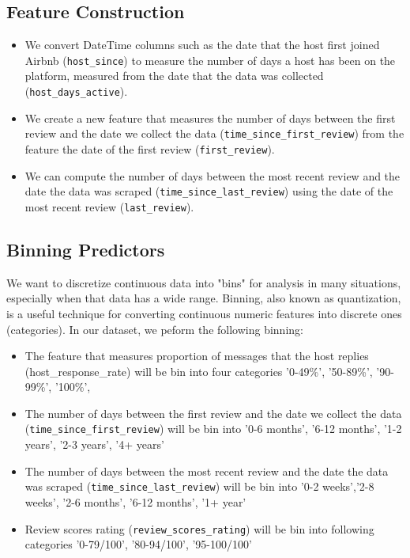 \subsection{Feature Construction}

\begin{itemize}

    \item We convert DateTime columns such as the date that the host first joined Airbnb
        (\texttt{host\_since}) to measure the number of days a host has been on
        the platform, measured from the date that the data was collected
        (\texttt{host\_days\_active}).

    \item We create a new feature that measures the number of days between the first
        review and  the date we collect the data
        (\texttt{time\_since\_first\_review}) from
        the feature the date of the first review (\texttt{first\_review}).

    \item We can compute the number of days between the most recent review and
        the date the data was scraped (\texttt{time\_since\_last\_review}) using the date of the
        most recent review (\texttt{last\_review}).
\end{itemize}

\subsection{Binning Predictors}

We want to discretize continuous data into "bins" for analysis in many situations, especially when that data has a wide range.
Binning, also known as quantization, is a useful technique for converting continuous numeric features into discrete ones (categories).
In our dataset, we peform the following binning:
\begin{itemize}

    \item The feature that measures proportion of messages that the host replies
(host\_response\_rate) will be bin into four categories '0-49\%', '50-89\%',
'90-99\%', '100\%',

    \item The number of days between the first review and the date we collect the data
        (\texttt{time\_since\_first\_review}) will be bin into '0-6 months', '6-12 months', '1-2
    years', '2-3 years', '4+ years'

    \item The number of days between the most recent review and the date the data was
        scraped (\texttt{time\_since\_last\_review}) will be bin into '0-2 weeks','2-8 weeks',
    '2-6 months', '6-12 months', '1+ year'

    \item Review scores rating (\texttt{review\_scores\_rating}) will be bin into following
        categories '0-79/100', '80-94/100', '95-100/100'
\end{itemize}



